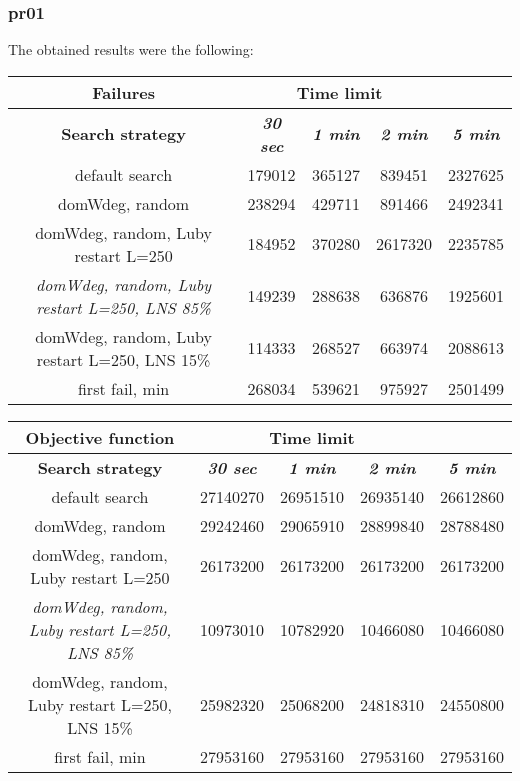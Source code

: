 \subsubsection{pr01}
The obtained results were the following:
{
\renewcommand{\arraystretch}{2}
\begin{longtable}[h]{| c | c | c | c | c |}
    \hline
    \textbf{Failures} & \multicolumn{3}{c}{Time limit} & \\
    \hline
    \textbf{Search strategy} & \textbf{\textit{30 sec}} & \textbf{\textit{1 min}} & \textbf{\textit{2 min}} & \textbf{\textit{5 min}} \\
    \hline
    \endhead
    default search                                         & 179012 & 365127 &  839451 & 2327625 \\
    \hline
    domWdeg, random                                        & 238294 & 429711 &  891466 & 2492341 \\
    \hline
    domWdeg, random, Luby restart L=250                    & 184952 & 370280 & 2617320 & 2235785 \\
    \hline
    \textit{domWdeg, random, Luby restart L=250, LNS 85\%} & 149239 & 288638 &  636876 & 1925601 \\
    \hline
    domWdeg, random, Luby restart L=250, LNS 15\%          & 114333 & 268527 &  663974 & 2088613 \\
    \hline
    first fail, min                                        & 268034 & 539621 &  975927 & 2501499 \\
    \hline
\end{longtable}
}

{
\renewcommand{\arraystretch}{2}
\begin{longtable}[h]{| c | c | c | c | c |}
    \hline
    \textbf{Objective function} & \multicolumn{3}{c}{Time limit} & \\
    \hline
    \textbf{Search strategy} & \textbf{\textit{30 sec}} & \textbf{\textit{1 min}} & \textbf{\textit{2 min}} & \textbf{\textit{5 min}} \\
    \hline
    \endhead
    default search                                         & 27140270 & 26951510 & 26935140 & 26612860 \\
    \hline
    domWdeg, random                                        & 29242460 & 29065910 & 28899840 & 28788480 \\
    \hline
    domWdeg, random, Luby restart L=250                    & 26173200 & 26173200 & 26173200 & 26173200 \\
    \hline
    \textit{domWdeg, random, Luby restart L=250, LNS 85\%} & 10973010 & 10782920 & 10466080 & 10466080 \\
    \hline
    domWdeg, random, Luby restart L=250, LNS 15\%          & 25982320 & 25068200 & 24818310 & 24550800 \\
    \hline
    first fail, min                                        & 27953160 & 27953160 & 27953160 & 27953160 \\
    \hline
\end{longtable}
}

